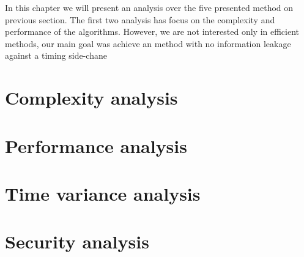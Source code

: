 In this chapter we will present an analysis over the five presented method on previous section. The first two analysis has focus on the complexity and performance of the algorithms. However, we are not interested only in efficient methods, our main goal was achieve an method with no information leakage against a timing side-chane

\section{Complexity analysis}
\section{Performance analysis}
\section{Time variance analysis}
\section{Security analysis}